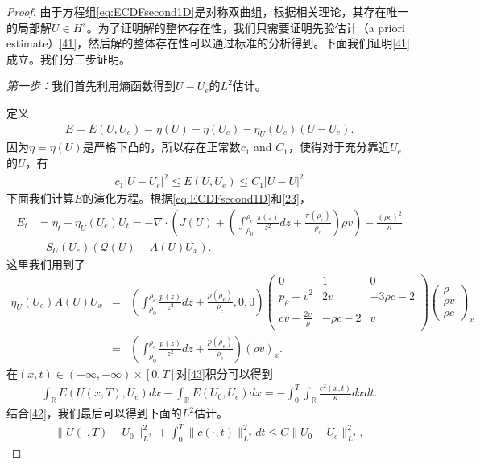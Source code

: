 \begin{proof}
由于方程组\eqref{eq:ECDFsecond1D}是对称双曲组，根据相关理论\cite{majda1984compressible, kato1975cauchy}，其存在唯一的局部解$U \in H^s$。为了证明解的整体存在性，我们只需要证明先验估计（a priori estimate）\eqref{41}，然后解的整体存在性可以通过标准的分析得到\cite{yong2004entropy}。下面我们证明\eqref{41}成立。我们分三步证明。

\emph{第一步：}我们首先利用熵函数得到$U-U_e$的$L^2$估计。

定义
\begin{eqnarray*}
E=E(U,U_e) = \eta(U)-\eta(U_e)-\eta_U(U_e)(U-U_e).
\end{eqnarray*}
因为$\eta=\eta(U)$是严格下凸的，所以存在正常数$c_1$ and $C_1$，使得对于充分靠近$U_e$的$U$，有
\begin{eqnarray}\label{42}
c_1 |U-U_e|^2 \le E(U,U_e) \le C_1 |U-U|^2
\end{eqnarray}
下面我们计算$E$的演化方程。根据\eqref{eq:ECDFsecond1D}和\eqref{23}，
\begin{eqnarray}\label{43}
E_t &= \eta_t - \eta_U(U_e)U_t = -\nabla \cdot \left(J(U) +( \int_{\rho_0}^{\rho_e} \frac{\pi(z)}{z^2} dz + \frac{\pi(\rho_e)}{\rho_e})\rho v \right) - \frac{(\rho c)^2}{\kappa} \\
& - S_U(U_e)(\mathcal{Q}(U) - A(U)U_x).
\end{eqnarray}
这里我们用到了
\begin{eqnarray*}
\eta_U(U_e) A(U) U_x &=& ( \int_{\rho_0}^{\rho_e} \frac{p(z)}{z^2} dz + \frac{p(\rho_e)}{\rho_e}, 0, 0)
\left( \begin{array}{ccc}
		0 & 1 & 0 \\
		p_\rho - v^2 & 2v & -3 \rho c - 2 \\
		cv + \frac{2 v}{\rho} & -  \rho c - 2 & v 
	\end{array}\right)
\left( \begin{array}{ccc}
\rho \\ \rho v \\ \rho c \end{array} \right)_x \\
&=& \left( \int_{\rho_0}^{\rho_e} \frac{p(z)}{z^2} dz + \frac{p(\rho_e)}{\rho_e}\right) (\rho v )_x.
\end{eqnarray*}
在$(x, t)\in(-\infty, + \infty)\times[0,T]$对\eqref{43}积分可以得到
\begin{eqnarray*}
\int_\mathbb{R}E(U(x, T), U_e)dx - \int_\mathbb{R} E(U_0, U_e)dx = - \int_0^T\int_\mathbb{R} \frac{c^2(x, t)}{\kappa} dx dt.
\end{eqnarray*}
结合\eqref{42}，我们最后可以得到下面的$L^2$估计。
\begin{eqnarray}\label{44}
\|U(\cdot, T)-U_0\|^2_{L^2} + \int_0^T \|c(\cdot, t)\|^2_{L^2}dt \le C\|U_0 - U_e\|^2_{L^2},
\end{eqnarray}


\end{proof}
